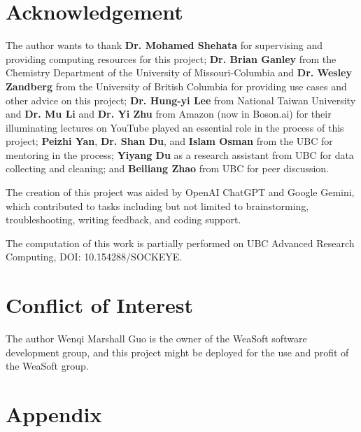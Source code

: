 \documentclass[12pt]{article}
\begin{document}
\section*{Acknowledgement} 
The author wants to thank  \textbf{Dr. Mohamed Shehata} for supervising and providing computing resources for this project; \textbf{Dr. Brian Ganley} from the Chemistry Department of the University of Missouri-Columbia and \textbf{Dr. Wesley Zandberg} from the University of British Columbia for providing use cases and other advice on this project; \textbf{Dr. Hung-yi Lee} from National Taiwan University and \textbf{Dr. Mu Li} and \textbf{Dr. Yi Zhu} from Amazon (now in Boson.ai) for their illuminating lectures on YouTube played an essential role in the process of this project; \textbf{Peizhi Yan}, \textbf{Dr. Shan Du}, and \textbf{Islam Osman} from the UBC for mentoring in the process; \textbf{Yiyang Du} as a research assistant from UBC for data collecting and cleaning; and \textbf{Beiliang Zhao} from UBC for peer discussion.


The creation of this project was aided by OpenAI ChatGPT and Google Gemini, which contributed to tasks including but not limited to brainstorming, troubleshooting, writing feedback, and coding support.

The computation of this work is partially performed on UBC Advanced Research Computing, DOI: 10.154288/SOCKEYE.
\section*{Conflict of Interest}
The author Wenqi Marshall Guo is the owner of the WeaSoft software development group, and this project might be deployed for the use and profit of the WeaSoft group. 
\printbibliography
\pagebreak 
\section*{Appendix}
\end{document}
